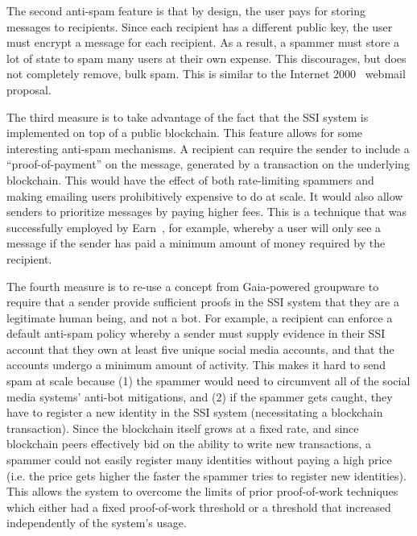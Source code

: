 The second anti-spam feature is that by design, the user pays for storing messages to recipients.  Since each
recipient has a different public key, the user must encrypt a message for each
recipient.  As a result, a spammer
must store a lot of state to spam many users at their own expense.  This
discourages, but does not completely remove, bulk spam.  This is similar to
the Internet 2000~\cite{internet-mail-2000} webmail proposal.

\hfill \break
{}
\hfill \break

The third measure is to take advantage of the fact that the SSI system is implemented on top of
a public blockchain.  This feature allows for some interesting anti-spam mechanisms.  A recipient can require the sender
to include a ``proof-of-payment'' on the message, generated by a transaction on the
underlying blockchain.  This would have the effect of both rate-limiting
spammers and making emailing users prohibitively expensive to do at scale.  It
would also allow senders to prioritize messages by paying higher fees. This
is a technique that was successfully employed by
Earn~\cite{earn-co}, for example, whereby a user will only see a
message if the sender has paid a minimum amount of money required by the
recipient.

\hfill \break
{}
\hfill \break

The fourth measure is to re-use a concept from Gaia-powered groupware to require
that a sender provide sufficient proofs in the SSI system that they are a
legitimate human being, and not a bot.  For example, a recipient can enforce a
default anti-spam policy whereby a sender must supply evidence in their SSI
account that they own at least five unique social media accounts, and that the
accounts undergo a minimum amount of activity.  This makes it hard to send
spam at scale because (1) the spammer would need to circumvent all of the social
media systems' anti-bot mitigations, and (2) if the spammer gets caught, they
have to register a new identity in the SSI system (necessitating a blockchain
transaction).  Since the blockchain itself grows at a fixed rate, and since
blockchain peers effectively bid on the ability to write new transactions, a
spammer could not easily register many identities without paying a high price
(i.e. the price gets higher the faster the spammer tries to register new
identities).  This allows the system to overcome the limits of prior proof-of-work
techniques~\cite{anti-spam-proof-of-work} which either had a fixed proof-of-work
threshold or a threshold that increased independently of the system's usage.

